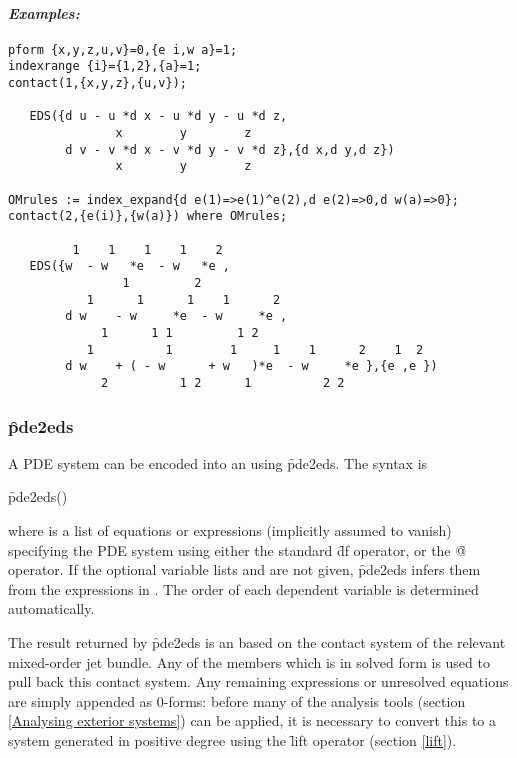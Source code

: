 \paragraph{\textit{Examples:}}
\begin{verbatim}
pform {x,y,z,u,v}=0,{e i,w a}=1;
indexrange {i}={1,2},{a}=1;
contact(1,{x,y,z},{u,v});

   EDS({d u - u *d x - u *d y - u *d z,
               x        y        z
        d v - v *d x - v *d y - v *d z},{d x,d y,d z})
               x        y        z

OMrules := index_expand{d e(1)=>e(1)^e(2),d e(2)=>0,d w(a)=>0};
contact(2,{e(i)},{w(a)}) where OMrules;

         1    1    1    1    2
   EDS({w  - w   *e  - w   *e ,
                1         2
           1      1      1    1      2
        d w    - w     *e  - w     *e ,
             1      1 1         1 2
           1          1        1     1    1      2    1  2
        d w    + ( - w      + w   )*e  - w     *e },{e ,e })
             2          1 2      1          2 2
\end{verbatim}

\subsubsection{\f{pde2eds}}
\label{pde2eds}

\hypertarget{operator:PDE2EDS}{}
A PDE system can be encoded into an  using \f{pde2eds}. The
syntax is
\begin{syntax}
	\f{pde2eds}()
\end{syntax}
where  is a list of equations or expressions (implicitly assumed
to vanish) specifying the PDE system using either
the standard \REDUCE \f{df} operator, or the  \f{@} operator. If the
optional variable lists  and  are not
given, \f{pde2eds} infers them from the expressions in . The
order of each dependent variable is determined automatically.

The result returned by \f{pde2eds} is an  based on the contact
system of the relevant mixed-order jet bundle. Any of the 
members which is in solved form is used to pull back this contact
system. Any remaining expressions or unresolved equations are simply
appended as 0-forms: before many of the analysis tools (section
\ref{Analysing exterior systems}) can be applied, it is necessary to
convert this to a system generated in positive degree using the \f{lift}
operator (section \ref{lift}).

